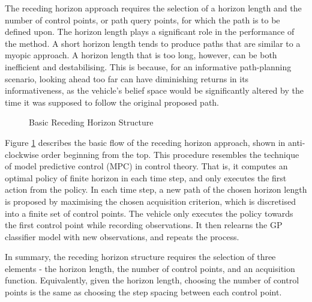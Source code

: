 			The receding horizon approach requires the selection of a horizon length and the number of control points, or path query points, for which the path is to be defined upon. The horizon length plays a significant role in the performance of the method. A short horizon length tends to produce paths that are similar to a myopic approach. A horizon length that is too long, however, can be both inefficient and destabilising. This is because, for an informative path-planning scenario, looking ahead too far can have diminishing returns in its informativeness, as the vehicle's belief space would be significantly altered by the time it was supposed to follow the original proposed path.
	
			\begin{figure}
				\begin{center}
				\end{center}
			\caption{Basic Receding Horizon Structure}
			\label{Figure:RecedingHorizonMethodOutline}
			\end{figure}
					
			Figure \ref{Figure:RecedingHorizonMethodOutline} describes the basic flow of the receding horizon approach, shown in anti-clockwise order beginning from the top. This procedure resembles the technique of model predictive control (MPC) in control theory. That is, it computes an optimal policy of finite horizon in each time step, and only executes the first action from the policy. In each time step, a new path of the chosen horizon length is proposed by maximising the chosen acquisition criterion, which is discretised into a finite set of control points. The vehicle only executes the policy towards the first control point while recording observations. It then relearns the GP classifier model with new observations, and repeats the process.
	
			In summary, the receding horizon structure requires the selection of three elements - the horizon length, the number of control points, and an acquisition function. Equivalently, given the horizon length, choosing the number of control points is the same as choosing the step spacing between each control point. 
			
